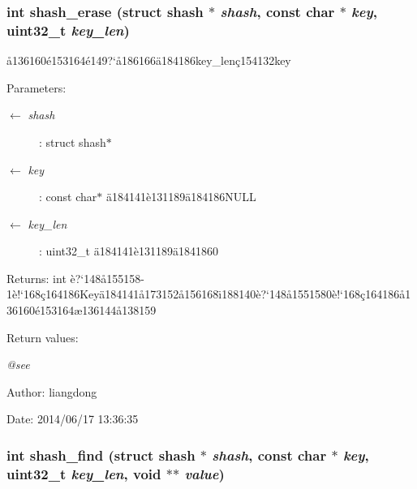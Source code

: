 \subsubsection{\setlength{\rightskip}{0pt plus 5cm}int shash\_\-erase (struct shash $\ast$ {\em shash}, const char $\ast$ {\em key}, uint32\_\-t {\em key\_\-len})}\label{shash_8h_a5}


\aa{}136160\'{e}153164\'{e}149?`\aa{}186166\"{a}184186key\_\-len\c{c}154132key 

\begin{Desc}
\item[Parameters:]
\begin{description}
\item[\mbox{$\leftarrow$} {\em shash}]: struct shash$\ast$ \item[\mbox{$\leftarrow$} {\em key}]: const char$\ast$ \"{a}184141\`{e}131189\"{a}184186NULL \item[\mbox{$\leftarrow$} {\em key\_\-len}]: uint32\_\-t \"{a}184141\`{e}131189\"{a}1841860 \end{description}
\end{Desc}
\begin{Desc}
\item[Returns:]int \`{e}?`148\aa{}155158-1\`{e}!`168\c{c}164186Key\"{a}184141\aa{}173152\aa{}156168\"{\i}188140\`{e}?`148\aa{}1551580\`{e}!`168\c{c}164186\aa{}136160\'{e}153164\ae{}136144\aa{}138159 \end{Desc}
\begin{Desc}
\item[Return values:]
\begin{description}
\item[{\em @see}]\end{description}
\end{Desc}
\begin{Desc}
\item[Author:]liangdong \end{Desc}
\begin{Desc}
\item[Date:]2014/06/17 13:36:35 \end{Desc}
\subsubsection{\setlength{\rightskip}{0pt plus 5cm}int shash\_\-find (struct shash $\ast$ {\em shash}, const char $\ast$ {\em key}, uint32\_\-t {\em key\_\-len}, void $\ast$$\ast$ {\em value})}\label{shash_8h_a6}


